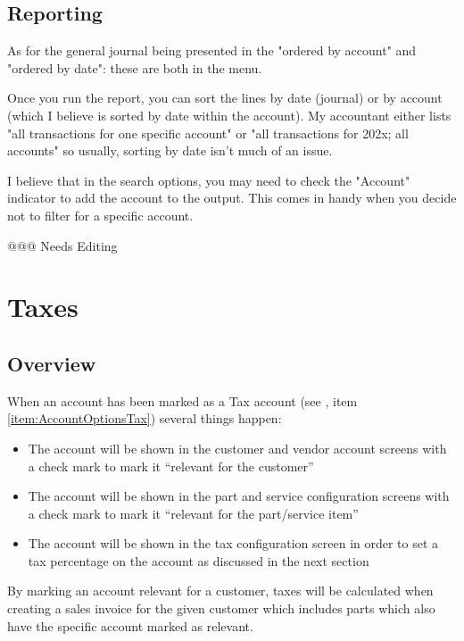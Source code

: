 \section{Reporting}
\label{sec-coa-reporting}

As for the general journal being presented in the "ordered by account" and "ordered by date": these are both in the  menu. 

Once you run the report, you can sort the lines by date (journal) or by account (which I believe is sorted by date within the account).
My accountant either lists "all transactions for one specific account" or "all transactions for 202x; all accounts"
so usually, sorting by date isn't much of an issue.

I believe that in the  search options, you may need to check the "Account" indicator to add the account to the output. This comes in handy when you decide not to filter for a specific account.

@@@ Needs Editing

\chapter{Taxes}
\label{cha-taxes}

\section{Overview}
\label{sec-tax-overview}

When an account has been marked as a Tax account (see , item
\ref{item:AccountOptionsTax}) several things happen:

\begin{itemize}
\item The account will be shown in the \gls{customer} and vendor account screens with
   a check mark to mark it ``relevant for the customer''
\item The account will be shown in the part and service configuration screens
   with a check mark to mark it ``relevant for the part/service item''
\item The account will be shown in the tax configuration screen in order to set
   a tax percentage on the account as discussed in the next section
\end{itemize}

By marking an account relevant for a \gls{customer}, taxes will be calculated when
creating a sales invoice for the given customer which includes parts which also
have the specific account marked as relevant.

